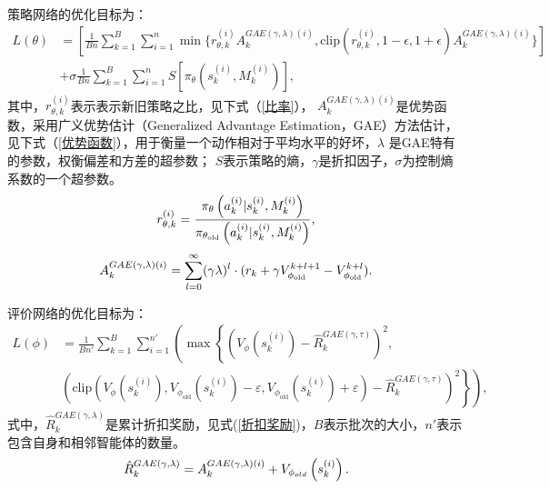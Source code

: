 策略网络的优化目标为：
\begin{equation}\label{策略网络的优化目标}
\begin{split}
    L(\theta) &= \left[\frac{1}{Bn} \sum_{k = 1}^{B} \sum_{i = 1}^{n} \min \{ r_{\theta,k}^{(i)} A_{k}^{GAE(\gamma,\lambda )(i)}, \text{clip}\left(r_{\theta,k}^{(i)}, 1 - \epsilon, 1 + \epsilon\right) A_{k}^{GAE(\gamma,\lambda )(i)}\} \right] \\
    &+ \sigma \frac{1}{Bn} \sum_{k = 1}^{B} \sum_{i = 1}^{n} S\left[\pi_{\theta}\left(s_{k}^{(i)},M^{(i)}_{k}\right)\right],
\end{split}
\end{equation}
其中，$r_{\theta,k}^{(i)}$表示表示新旧策略之比，见下式（\ref{比率}），
$A_{k}^{GAE(\gamma,\lambda )(i)}$是优势函数，采用广义优势估计（Generalized Advantage Estimation，GAE）方法估计，
见下式（\ref{优势函数}），用于衡量一个动作相对于平均水平的好坏，$\lambda$ 是GAE特有的参数，权衡偏差和方差的超参数；
$S$表示策略的熵，$\gamma$是折扣因子，$\sigma$为控制熵系数的一个超参数。
\begin{equation}\label{比率}
    \\r_{\theta,k}^{(i)} = \frac{\pi_{\theta}\left(a_{k}^{(i)}|s_{k}^{(i)},M^{(i)}_{k}\right)}{\pi_{\theta_{\text{old}}}\left(a_{k}^{(i)}|s_{k}^{(i)},M^{(i)}_{k}\right)},
\end{equation}
\begin{equation}\label{优势函数}
    \\A_{k}^{GAE(\gamma,\lambda )(i)} = \sum_{l = 0}^{\infty} (\gamma\lambda )^l \cdot (r_k + \gamma V^{k + l + 1}_{\phi_{\text{old}}} - V^{k + l}_{\phi_{\text{old}}}).
\end{equation}

评价网络的优化目标为：
\begin{equation}\label{评价网络的优化目标}
\begin{split}
    L(\phi) &= \frac{1}{Bn'} \sum_{k = 1}^{B} \sum_{i = 1}^{n'} \left( \max \left\{  \left(V_{\phi} \left(s_{k}^{(i)}\right) - \hat{R}^{GAE(\gamma,\tau)}_{k}\right)^2, \right.\right. \\
    &\left.\left. \left( \text{clip}\left(V_{\phi} \left(s_{k}^{(i)}\right), V_{\phi_{\text{old}}} \left(s_{k}^{(i)}\right) - \varepsilon, V_{\phi_{\text{old}}} \left(s_{k}^{(i)}\right) + \varepsilon\right) - \hat{R}^{GAE(\gamma,\tau )}_{k}\right)^2 \right\}  \right),
\end{split}
\end{equation}
式中，$\hat{R}^{GAE(\gamma,\lambda)}_{k}$是累计折扣奖励，见式(\ref{折扣奖励})，$B$表示批次的大小，$n'$表示包含自身和相邻智能体的数量。
\begin{equation}\label{折扣奖励}
    \\\hat{R}^{GAE(\gamma,\lambda)}_{k} = A_{k}^{GAE(\gamma,\lambda)(i)}+ V_{\phi_{old}} \left(s_{k}^{(i)}\right).
\end{equation}


